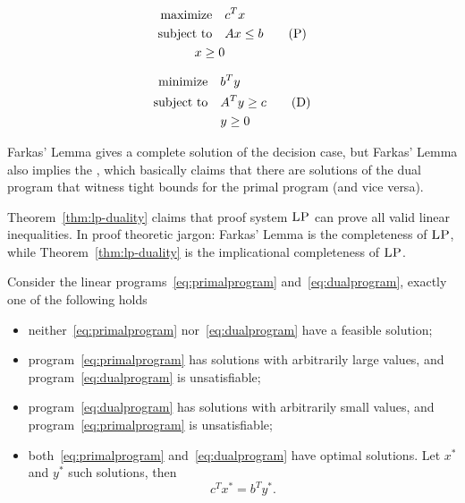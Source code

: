 \documentclass[a4paper,twoside,justified]{tufte-handout}
\begin{document}
\begin{figure}
\begin{minipage}[t]{0.5\textwidth}%
\begin{alignat}{2}
  \maximize c^{T}x\notag\\
\label{eq:primalprogram}\subjectto Ax \leq b \tag{P}\\
  \varpositive{x} \notag
\end{alignat}
\end{minipage}
\begin{minipage}[t]{0.5\textwidth}%
\begin{alignat}{2}
  \minimize b^{T}y \notag\\
  \label{eq:dualprogram}  \subjectto A^{T}y \geq c \tag{D}\\
  & \varpositive{y}\notag
\end{alignat}
\end{minipage}
\end{figure}

Farkas' Lemma gives a complete solution of the decision case, but
Farkas' Lemma also implies the , which
basically claims that there are solutions of the dual program that
witness tight bounds for the primal program (and vice versa).

\begin{marginfigure}
  Theorem~\ref{thm:lp-duality} claims that proof system
  $\textsc{LP}$ can prove all valid linear inequalities. In proof
  theoretic jargon:  Farkas' Lemma is the completeness of
  $\textsc{LP}$, while Theorem~\ref{thm:lp-duality} is the 
  implicational completeness of $ \textsc{LP}$.
\end{marginfigure}

\begin{theorem}\label{thm:lp-duality}
  Consider the linear programs~\eqref{eq:primalprogram}
  and~\eqref{eq:dualprogram}, exactly one of the following holds
  \begin{itemize}
    \item neither~\eqref{eq:primalprogram} nor~\eqref{eq:dualprogram} have a
    feasible solution;
    \item program~\eqref{eq:primalprogram} has solutions with
    arbitrarily large values, and program~\eqref{eq:dualprogram} is
    unsatisfiable;
    \item program~\eqref{eq:dualprogram} has solutions with
    arbitrarily small values, and program~\eqref{eq:primalprogram} is
    unsatisfiable;
    \item both~\eqref{eq:primalprogram} and~\eqref{eq:dualprogram}
    have optimal solutions. Let $ x^{*}$ and $ y^{*}$ such solutions, then
    \begin{equation*}
      c^{T} x^{*}=b^{T}y^{*}.
    \end{equation*}
  \end{itemize}
\end{theorem}
\end{document}
